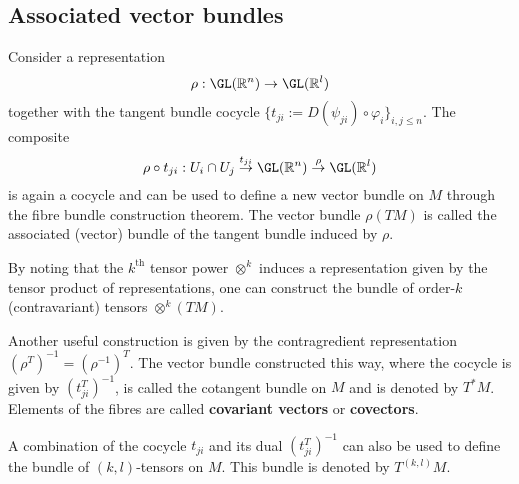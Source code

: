 \subsection{Associated vector bundles}

    \begin{construct}\label{bundle:associated_vector_bundle}
        Consider a representation \[\rho:\GL(\mathbb{R}^n)\rightarrow\GL(\mathbb{R}^l)\] together with the tangent bundle cocycle $\{t_{ji} := D(\psi_{ji})\circ\varphi_i\}_{i,j\leq n}$. The composite \[\rho\circ t_{ji}:U_i\cap U_j\overset{t_{ji}}{\rightarrow}\GL(\mathbb{R}^n)\overset{\rho}{\rightarrow}\GL(\mathbb{R}^l)\] is again a cocycle and can be used to define a new vector bundle on $M$ through the fibre bundle construction theorem. The vector bundle $\rho(TM)$ is called the associated (vector) bundle of the tangent bundle induced by $\rho$.
    \end{construct}

    \begin{example}
        By noting that the $k^{\text{th}}$ tensor power $\otimes^k$ induces a representation given by the tensor product of representations, one can construct the bundle of order-$k$ (contravariant) tensors $\otimes^k(TM)$.
    \end{example}
    \begin{example}\label{bundle:cotangent_bundle}
        Another useful construction is given by the contragredient representation $(\rho^T)^{-1}=(\rho^{-1})^T$. The vector bundle constructed this way, where the cocycle is given by $(t_{ji}^T)^{-1}$, is called the cotangent bundle on $M$ and is denoted by $T^*M$. Elements of the fibres are called \textbf{covariant vectors} or \textbf{covectors}.
    \end{example}
    \begin{notation}
        A combination of the cocycle $t_{ji}$ and its dual $(t_{ji}^T)^{-1}$ can also be used to define the bundle of $(k,l)$-tensors on $M$. This bundle is denoted by $T^{(k,l)}M$.
    \end{notation}


